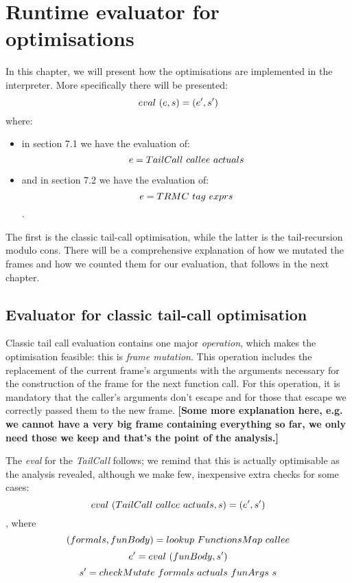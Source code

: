 \documentclass[diploma]{softlab-thesis}
\begin{document}

\chapter {Runtime evaluator for optimisations}
In this chapter, we will present how the optimisations are implemented in the interpreter.
More specifically there will be presented:
\[eval \hfill\ (e, s) = (e', s') \]
where:
\begin{itemize}
\item in section 7.1 we have the evaluation of:
\[e = TailCall \hfill\ callee \hfill\ actuals \] 
\item and in section 7.2 we have the evaluation of:
\[e = TRMC \hfill\ tag \hfill\ exprs \].
\end{itemize}
The first is the classic tail-call optimisation, while the latter is the tail-recursion 
modulo cons. There will be a comprehensive explanation of how we mutated the frames and how we counted them for 
our evaluation, that follows in the next chapter.

\section {Evaluator for classic tail-call optimisation}

Classic tail call evaluation contains one major \textit{operation}, which makes the optimisation 
feasible: this is \textit{frame mutation}. This operation includes the replacement of the current frame's arguments 
with the arguments necessary for the construction of the frame for the next function call. For this operation,
it is mandatory that the caller's arguments don't escape and for those that escape we correctly passed them 
to the new frame.
\textbf{[Some more explanation here, e.g. we cannot have a very big frame containing everything so far, 
we only need those we keep and that's the point of the analysis.]}

The \textit{eval} for the \textit{TailCall} follows; we remind that this is actually optimisable as the analysis 
revealed, although we make few, inexpensive extra checks for some cases:
\[eval \hfill\ (TailCall \hfill\ callee \hfill\ actuals, s) = (e', s')\], where
\[(formals, funBody) = lookup \hfill\ FunctionsMap \hfill\ callee \]
\[e' = eval \hfill\ (funBody, s') \]
\[s' = checkMutate \hfill\ formals \hfill\ actuals \hfill\ funArgs \hfill\ s \]
\end{document}
